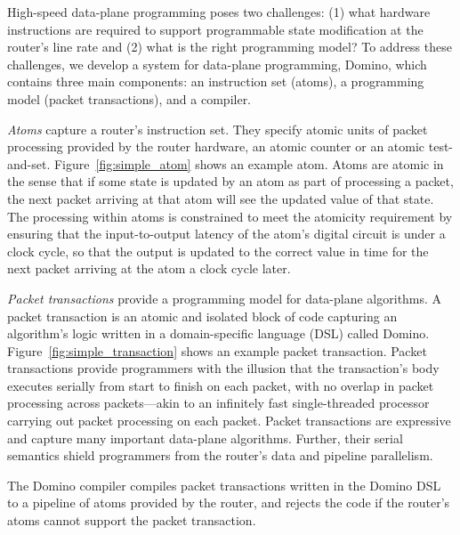 High-speed data-plane programming poses two challenges: (1) what hardware
instructions are required to support programmable state modification at the
router's line rate and (2) what is the right programming model? To address
these challenges, we develop a system for data-plane programming, Domino, which
contains three main components: an instruction set (atoms), a programming model
(packet transactions), and a compiler.

 \textit{Atoms} capture a router's instruction set. They specify
atomic units of packet processing provided by the router hardware, \eg an
atomic counter or an atomic test-and-set. Figure~\ref{fig:simple_atom} shows an
example atom. Atoms are atomic in the sense that if some state is updated by an
atom as part of processing a packet, the next packet arriving at that atom will
see the updated value of that state. The processing within atoms is constrained
to meet the atomicity requirement by ensuring that the input-to-output latency
of the atom's digital circuit is under a clock cycle, so that the output is
updated to the correct value in time for the next packet arriving at the atom a
clock cycle later.

 \textit{Packet transactions} provide a programming
model for data-plane algorithms. A packet transaction is an atomic and isolated
block of code capturing an algorithm's logic written in a domain-specific
language (DSL) called Domino. Figure~\ref{fig:simple_transaction} shows an
example packet transaction.  Packet transactions provide programmers with the
illusion that the transaction's body executes serially from start to finish on
each packet, with no overlap in packet processing across packets---akin to an
infinitely fast single-threaded processor carrying out packet processing on
each packet. Packet transactions are expressive and capture many important
data-plane algorithms.  Further, their serial semantics shield programmers from
the router's data and pipeline parallelism.

 The Domino compiler compiles packet transactions written
in the Domino DSL to a pipeline of atoms provided by the router, and rejects
the code if the router's atoms cannot support the packet transaction.

